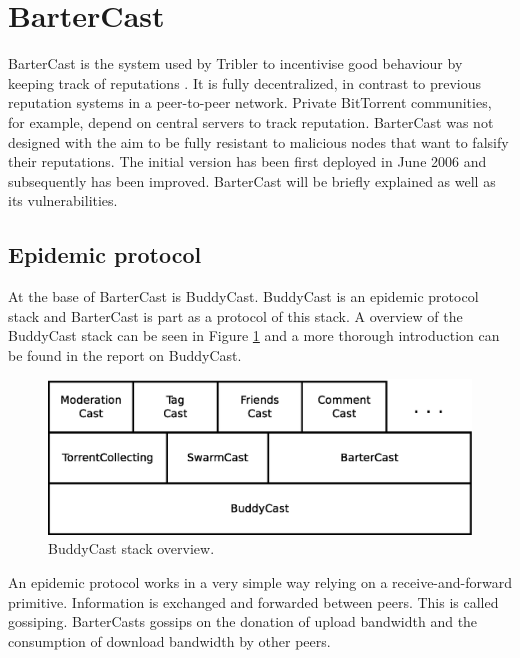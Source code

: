 \section{BarterCast}
\label{sect:bartercast}
BarterCast is the system used by Tribler to incentivise good behaviour by keeping track of reputations
\cite{pouwelse-buddycast}\cite{meulpolder-bartercast}\cite{meulpolder-bartercast-paper}\cite{dumitrescu-tribler}.
It is fully decentralized, in contrast to previous reputation systems in a peer-to-peer network.
Private BitTorrent communities, for example, depend on central servers to track reputation\cite{meulpolder-bartercast}.
BarterCast was not designed with the aim to be fully resistant to malicious nodes
that want to falsify their reputations.
The initial version has been first deployed in June 2006
and subsequently has been improved.
BarterCast will be briefly explained as well as its vulnerabilities.

\subsection{Epidemic protocol}
At the base of BarterCast is BuddyCast.
BuddyCast is an epidemic protocol stack and BarterCast is part as a protocol of this stack.
A overview of the BuddyCast stack can be seen in Figure \ref{fig:buddycast-stack}
and a more thorough introduction can be found in the report on BuddyCast\cite{pouwelse-buddycast}.

\begin{figure}
	\centerline{\includegraphics[scale=0.3]{relatedWork/figs/buddycast-stack.eps}}
	\caption{BuddyCast stack overview\cite{pouwelse-buddycast}.}
	\label{fig:buddycast-stack}
\end{figure}

An epidemic protocol works in a very simple way relying on a receive-and-forward primitive.
Information is exchanged and forwarded between peers.
This is called gossiping.
BarterCasts gossips on the donation of upload bandwidth
and the consumption of download bandwidth by other peers.

